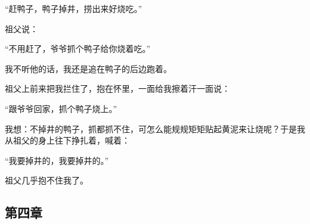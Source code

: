 \par “赶鸭子，鸭子掉井，捞出来好烧吃。”
\par 祖父说：
\par “不用赶了，爷爷抓个鸭子给你烧着吃。”
\par 我不听他的话，我还是追在鸭子的后边跑着。
\par 祖父上前来把我拦住了，抱在怀里，一面给我擦着汗一面说：
\par “跟爷爷回家，抓个鸭子烧上。”
\par 我想：不掉井的鸭子，抓都抓不住，可怎么能规规矩矩贴起黄泥来让烧呢？于是我从祖父的身上往下挣扎着，喊着：
\par “我要掉井的，我要掉井的。”
\par 祖父几乎抱不住我了。

\subsection{第四章}

